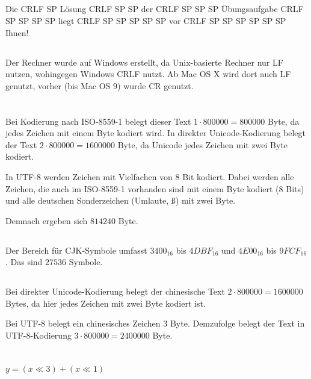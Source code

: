 \documentclass[10pt,a4paper,oneside,ngerman,numbers=noenddot]{scrartcl}
\begin{document}
\subsection{} %
Die CRLF SP Lösung CRLF SP SP der CRLF SP SP SP Übungsaufgabe CRLF SP SP SP SP liegt CRLF SP SP SP SP SP vor CRLF SP SP SP SP SP SP Ihnen!
\subsection{} %
Der Rechner wurde auf Windows erstellt, da Unix-basierte Rechner nur LF nutzen, wohingegen Windows CRLF nutzt. Ab Mac OS X wird dort auch LF genutzt, vorher (bis Mac OS 9) wurde CR genutzt.
\section{}%
\subsection{} %
Bei Kodierung nach ISO-8559-1 belegt dieser Text $1 \cdot 800000 = 800000$ Byte, da jedes Zeichen mit einem Byte kodiert wird. In direkter Unicode-Kodierung belegt der Text $2 \cdot 800000 = 1600000$ Byte, da Unicode jedes Zeichen mit zwei Byte kodiert.

In UTF-8 werden Zeichen mit Vielfachen von $8$ Bit kodiert. Dabei werden alle Zeichen, die auch im ISO-8559-1 vorhanden sind mit einem Byte kodiert ($8$ Bits) und alle deutschen Sonderzeichen (Umlaute, ß) mit zwei Byte.

Demnach ergeben sich $814240$ Byte.
\subsection{} %
Der Bereich für CJK-Symbole umfasst $3400_{16}$ bis $4DBF_{16}$ und $4E00_{16}$ bis $9FCF_{16}$. Das sind $27536$ Symbole.
\subsection{} %
Bei direkter Unicode-Kodierung belegt der chinesische Text $2 \cdot 800000 = 1600000$ Bytes, da hier jedes Zeichen mit zwei Byte kodiert ist.

Bei UTF-8 belegt ein chinesisches Zeichen 3 Byte. Demzufolge belegt der Text in UTF-8-Kodierung $3 \cdot 800000 = 2400000$ Byte.
\section{}%
\subsection{} %
$y = (x \ll 3) + (x \ll 1)$
\end{document}
